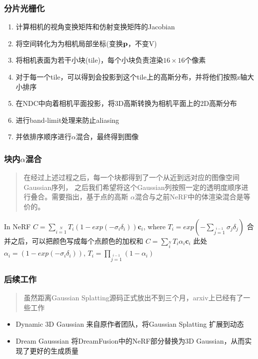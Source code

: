 \begin{frame}
    \frametitle{分片光栅化}
    \begin{enumerate}
        \item 计算相机的视角变换矩阵和仿射变换矩阵的Jacobian
        \item 将空间转化为为相机局部坐标(变换$\bf{p}$，不变V)
        \item 将相机表面为若干小块(tile)，每个小块负责渲染$16\times 16$个像素
        \item 对于每一个tile，可以得到会投影到这个tile上的高斯分布，并将他们按照z轴大小排序
        \item 在NDC中向着相机平面投影，将3D高斯转换为相机平面上的2D高斯分布
        \item 进行band-limit处理来防止aliasing 
        \item 并依排序顺序进行$\alpha$混合，最终得到图像
    \end{enumerate}
\end{frame}

\begin{frame}
    \frametitle{块内$\alpha$混合}
    \begin{quote}
        在经过上述过程之后，每一个块都得到了一个从近到远对应的图像空间Gaussian序列，
        之后我们希望将这个Gaussian列按照一定的透明度顺序进行叠合。需要指出，基于点的高斯
        $\alpha$混合与之前NeRF中的体渲染混合是等价的。
    \end{quote}
    In NeRF
    $C=\sum\limits_{i=1}\limits^{N} T_i(1-exp(-\sigma_i\delta_i))\mathbf{c}_i$, where $T_i=exp(-\sum\limits_{j=1}\limits^{i-1} \sigma_j\delta_j)$
    合并之后，可以把颜色写成每个点颜色的加权和
    $C=\sum\limits_{i}\limits^{N} T_i\alpha_i\mathbf{c}_i$
    此处
    $\alpha_i = (1-exp(-\sigma_i\delta_i))$, $T_i=\prod\limits_{j=1}\limits^{i-1}(1-\alpha_i)$
\end{frame}

\begin{frame}
    \frametitle{后续工作}
    \begin{quote}
        虽然距离Gaussian Splatting源码正式放出不到三个月，arxiv上已经有了一些工作
    \end{quote}
    \begin{itemize}
        \item Dynamic 3D Gaussian \cite{luitenDynamic3DGaussians2023} 来自原作者团队，将Gaussian Splatting 扩展到动态
        \item Dream Gausssian \cite{tangDreamGaussianGenerativeGaussian2023} 将DreamFusion\cite{pooleDreamFusionTextto3DUsing2022}中的NeRF部分替换为3D Gaussian，从而实现了更好的生成质量
    \end{itemize}
\end{frame}